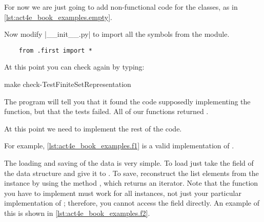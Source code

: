 For now we are just going to add non-functional code for the classes,
as in \cref{lst:act4e_book_examples.empty}.

\begin{longcode}
    \caption{}

    \label{lst:act4e_book_examples.empty}
\end{longcode}

Now modify \files|__init__.py| to import all the symbols from the  module.

\begin{verbatim}
    from .first import *
\end{verbatim}

At this point you can check again by typing:

\begin{console}
    make check-TestFiniteSetRepresentation
\end{console}

The program will tell you that it found the code supposedly implementing the function,
but that the tests failed.
All of our functions returned .

At this point we need to implement the rest of the code.

For example, \cref{lst:act4e_book_examples.f1} is a valid implementation of \FiniteSet.

\begin{longcode}
    \caption{}
    \label{lst:act4e_book_examples.f1}
\end{longcode}

The loading and saving of the data is very simple.
To load just take the  field of the data structure and give it to .
To save, reconstruct the list elements from the  instance by using the method , which returns an iterator.
Note that the  function you have to implement must work for all \FiniteSet instances, not just your particular implementation of \FiniteSet; therefore, you cannot access the  field directly.
An example of this is shown in \cref{lst:act4e_book_examples.f2}.

\begin{longcode}
    \caption{}
    \label{lst:act4e_book_examples.f2}
\end{longcode}

